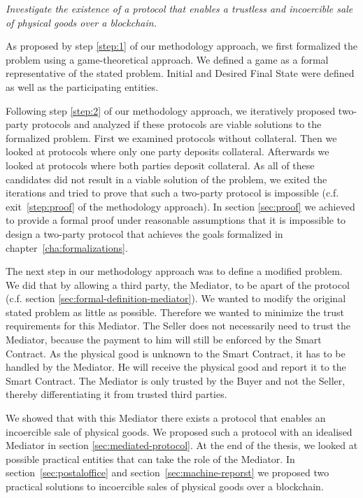 \documentclass{cacthesis}
\begin{document}
\emph{Investigate the existence of a protocol that enables a trustless and incoercible sale of physical goods over a blockchain.}\newline

 As proposed by step \ref{step:1} of our methodology approach, we first formalized the problem using a game-theoretical approach. We defined a game as a formal representative of the stated problem. Initial and Desired Final State were defined as well as the participating entities.\newline
 
 Following step \ref{step:2} of our methodology approach, we iteratively proposed two-party protocols and analyzed if these protocols are viable solutions to the formalized problem. First we examined protocols without collateral. Then we looked at protocols where only one party deposits collateral.
 Afterwards we looked at protocols where both parties deposit collateral. As all of these candidates did not result in a viable solution of the problem, we exited the iterations and tried to prove that such a two-party protocol is impossible (c.f. exit~\ref{step:proof} of the methodology approach). In section \ref{sec:proof} we achieved to provide a formal proof under reasonable assumptions that it is impossible to design a two-party protocol that achieves the goals formalized in chapter~\ref{cha:formalizations}.\newline
 
  The next step in our methodology approach was to define a modified problem. We did that by allowing a third party, the Mediator, to be apart of the protocol (c.f. section \ref{sec:formal-definition-mediator}). We wanted to modify the original stated problem as little as possible. Therefore we wanted to minimize the trust requirements for this Mediator. The Seller does not necessarily need to trust the Mediator, because the payment to him will still be enforced by the Smart Contract. As the physical good is unknown to the Smart Contract, it has to be handled by the Mediator. He will receive the physical good and report it to the Smart Contract. The Mediator is only trusted by the Buyer and not the Seller, thereby differentiating it from trusted third parties.\newline
  
  We showed that with this Mediator there exists a protocol that enables an incoercible sale of physical goods. We proposed such a protocol with an idealised Mediator in section \ref{sec:mediated-protocol}. At the end of the thesis, we looked at possible practical entities that can take the role of the Mediator. In section~\ref{sec:postaloffice} and section~\ref{sec:machine-reporst} we proposed two practical solutions to incoercible sales of physical goods over a blockchain. 
  
\end{document}
